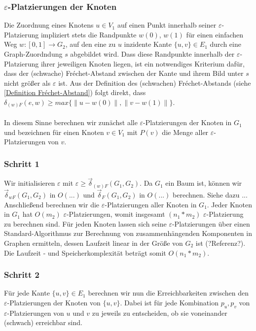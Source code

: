 \documentclass[a4paper, 12pt, twoside]{article}
\theoremstyle{Format1} %
\begin{document}
\subsubsection{$\varepsilon$-Platzierungen der Knoten} \label{Platzierungen der Knoten}
Die Zuordnung eines Knotens $u \in V_1$ auf einen Punkt innerhalb seiner $\varepsilon$-Platzierung impliziert stets die Randpunkte $w(0)$, $w(1)$
für einen einfachen Weg $w: [0,1] \to G_2$, auf den eine zu $u$ inzidente Kante $\{u,v\} \in E_1$ durch eine Graph-Zuordndung $s$ abgebildet wird.
Dass diese Randpunkte innerhalb der $\varepsilon$-Platzierung ihrer jeweiligen Knoten liegen, ist ein notwendiges Kriterium dafür, dass der (schwache) Fréchet-Abstand
zwischen der Kante und ihrem Bild unter $s$ nicht größer als $\varepsilon$ ist. Aus der Definition des (schwachen) Fréchet-Abstands (siehe \ref{Definition Fréchet-Abstand}) folgt direkt, dass
$\delta_{(w)F}(e, w) \geq max{\{\|u-w(0)\|, \|v-w(1)\|\}}$.
\\
\\
In diesem Sinne berechnen wir zunächst alle $\varepsilon$-Platzierungen der Knoten in $G_1$ und bezeichnen für einen Knoten $v \in V_1$ mit $P(v)$ die Menge aller $\varepsilon$-Platzierungen von $v$.

\subsubsection{Schritt 1} \label{Schritt 1}
Wir initialisieren $\varepsilon$ mit $\varepsilon \geq \vec{\delta}_{(w)F}(G_1, G_2)$. Da $G_1$ ein Baum ist, können wir
$\vec{\delta}_{wF}(G_1, G_2)$ in $O(...)$ und $\vec{\delta}_F(G_1, G_2)$ in $O(...)$ berechnen. Siehe dazu ...
Anschließend berechnen wir die $\varepsilon$-Platzierungen aller Knoten in $G_1$. Jeder Knoten in $G_1$ hat $O(m_2)$
$\varepsilon$-Platzierungen, womit insgesamt $(n_1*m_2)$ $\varepsilon$-Platzierung zu berechnen sind.
Für jeden Knoten lassen sich seine $\varepsilon$-Platzierungen über einen Standard-Algorithmus zur Berechnung von
zusammenhängenden Komponenten in Graphen ermitteln, dessen Laufzeit linear in der Größe von $G_2$ ist (?Referenz?).
Die Laufzeit - und Speicherkomplexität beträgt somit $O(n_1*m_2)$.

\subsubsection{Schritt 2} \label{Schritt 2}
Für jede Kante $\{u, v\} \in E_1$ berechnen wir nun die Erreichbarkeiten zwischen den $\varepsilon$-Platzierungen der Knoten von $\{u,v\}$.
Dabei ist für jede Kombination $p_u, p_v$ von $\varepsilon$-Platzierungen von $u$ und $v$ zu jeweils zu entscheiden, ob sie voneinander (schwach) erreichbar sind.
\end{document}
